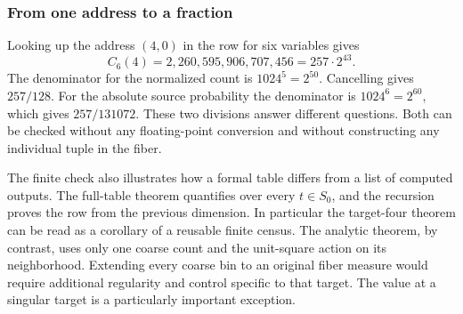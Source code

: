 \documentclass[12pt,letterpaper]{article}
\begin{document}
\subsubsection{From one address to a fraction}
Looking up the address $(4,0)$ in the row for six variables gives
\[
 C_6(4)=2{,}260{,}595{,}906{,}707{,}456=257\cdot2^{43}.
\]
The denominator for the normalized count is $1024^5=2^{50}$. Cancelling gives $257/128$. For the absolute source probability the denominator is $1024^6=2^{60}$, which gives $257/131072$. These two divisions answer different questions. Both can be checked without any floating-point conversion and without constructing any individual tuple in the fiber.
\par
The finite check also illustrates how a formal table differs from a list of computed outputs. The full-table theorem quantifies over every $t\in S_0$, and the recursion proves the row from the previous dimension. In particular the target-four theorem can be read as a corollary of a reusable finite census. The analytic theorem, by contrast, uses only one coarse count and the unit-square action on its neighborhood. Extending every coarse bin to an original fiber measure would require additional regularity and control specific to that target. The value at a singular target is a particularly important exception.
\end{document}
